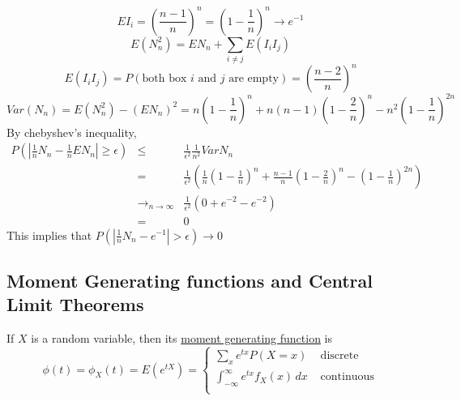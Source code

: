   $$
    EI_i = \left(\frac{n-1}{n}\right)^n = \left(1 - \frac{1}{n}\right)^n \to e^{-1}
  $$
  $$
    E(N_n^2) = EN_n + \sum_{i \not= j} E(I_iI_j)
  $$
  $$
    E(I_iI_j) = P(\text{both box $i$ and $j$ are empty}) = \left(\frac{n - 2}{n}\right)^n
  $$
  $$
    Var(N_n) = E(N_n^2) - (EN_n)^2 = n\left(1 - \frac{1}{n}\right)^n + 
    n(n-1)\left(1 - \frac{2}{n}\right)^n - n^2 \left(1 - 
    \frac{1}{n}\right)^{2n}
  $$
  By chebyshev's inequality,
  \begin{eqnarray*}
    P\left(\left|\frac{1}{n}N_n - \frac{1}{n}EN_n\right| \ge \epsilon\right)
      & \le & \frac{1}{\epsilon^2} \frac{1}{n^2} VarN_n\\
      & = & \frac{1}{\epsilon^2}\left(\frac{1}{n}\left(1 - \frac{1}{n}\right)^n 
        + \frac{n-1}{n}\left(1 - \frac{2}{n}\right)^n - \left(1 - 
        \frac{1}{n}\right)^{2n}\right)\\
      & \to_{n \to \infty} & \frac{1}{\epsilon^2}(0 + e^{-2} - e^{-2})\\
      & = & 0
  \end{eqnarray*}
  This implies that $P\left(\left|\frac{1}{n}N_n - e^{-1}\right| > 
  \epsilon \right) \to 0$

\subsection*{Moment Generating functions and Central Limit Theorems}
  If $X$ is a random variable, then its \underline{moment generating 
  function} is 
  $$
    \phi(t) = \phi_X(t) = E(e^{tX}) = 
    \begin{cases} 
      \sum_x e^{tx} P(X=x) & \text{ discrete}\\
      \int_{-\infty}^{\infty} e^{tx} f_X(x) \,dx & \text{ continuous}\\
    \end{cases}
  $$
